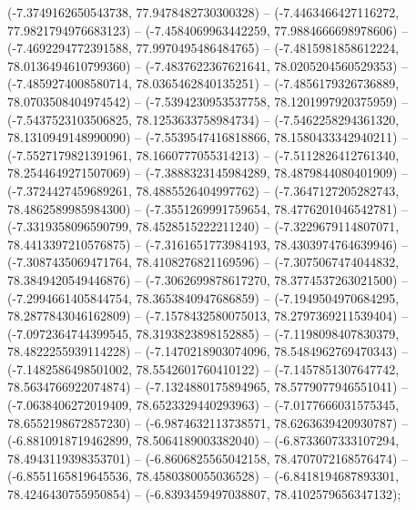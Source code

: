 (-7.3749162650543738, 77.9478482730300328) -- (-7.4463466427116272, 77.9821794976683123) -- (-7.4584069963442259, 77.9884666698978606) -- (-7.4692294772391588, 77.9970495486484765) -- (-7.4815981858612224, 78.0136494610799360) -- (-7.4837622367621641, 78.0205204560529353) -- (-7.4859274008580714, 78.0365462840135251) -- (-7.4856179326736889, 78.0703508404974542) -- (-7.5394230953537758, 78.1201997920375959) -- (-7.5437523103506825, 78.1253633758984734) -- (-7.5462258294361320, 78.1310949148990090) -- (-7.5539547416818866, 78.1580433342940211) -- (-7.5527179821391961, 78.1660777055314213) -- (-7.5112826412761340, 78.2544649271507069) -- (-7.3888323145984289, 78.4879844080401909) -- (-7.3724427459689261, 78.4885526404997762) -- (-7.3647127205282743, 78.4862589985984300) -- (-7.3551269991759654, 78.4776201046542781) -- (-7.3319358096590799, 78.4528515222211240) -- (-7.3229679114807071, 78.4413397210576875) -- (-7.3161651773984193, 78.4303974764639946) -- (-7.3087435069471764, 78.4108276821169596) -- (-7.3075067474044832, 78.3849420549446876) -- (-7.3062699878617270, 78.3774537263021500) -- (-7.2994661405844754, 78.3653840947686859) -- (-7.1949504970684295, 78.2877843046162809) -- (-7.1578432580075013, 78.2797369211539404) -- (-7.0972364744399545, 78.3193823898152885) -- (-7.1198098407830379, 78.4822255939114228) -- (-7.1470218903074096, 78.5484962769470343) -- (-7.1482586498501002, 78.5542601760410122) -- (-7.1457851307647742, 78.5634766922074874) -- (-7.1324880175894965, 78.5779077946551041) -- (-7.0638406272019409, 78.6523329440293963) -- (-7.0177666031575345, 78.6552198672857230) -- (-6.9874632113738571, 78.6263639420930787) -- (-6.8810918719462899, 78.5064189003382040) -- (-6.8733607333107294, 78.4943119398353701) -- (-6.8606825565042158, 78.4707072168576474) -- (-6.8551165819645536, 78.4580380055036528) -- (-6.8418194687893301, 78.4246430755950854) -- (-6.8393459497038807, 78.4102579656347132);
